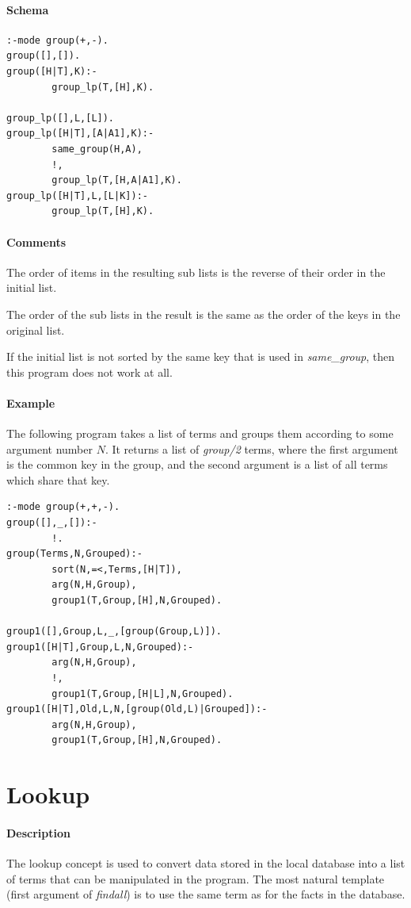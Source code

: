 \documentclass[a4paper,12pt]{report}
\begin{document}
\paragraph{Schema}
\begin{verbatim}
:-mode group(+,-).
group([],[]).
group([H|T],K):-
        group_lp(T,[H],K).

group_lp([],L,[L]).
group_lp([H|T],[A|A1],K):-
        same_group(H,A),
        !,
        group_lp(T,[H,A|A1],K).
group_lp([H|T],L,[L|K]):-
        group_lp(T,[H],K).
\end{verbatim}
\paragraph{Comments}
The order of items in the resulting sub lists is the reverse of their order in the initial list.

The order of the sub lists in the result is the same as the order of the keys in the original list.

If the initial list is not sorted by the same key that is used in {\it same\_group}, then this program does not work at all.
\paragraph{Example}
The following program takes a list of terms and groups them according to some argument number $N$. It returns a list of {\it group/2} terms, where the first argument is the common key in the group, and the second argument is a list of all terms which share that key.
\begin{verbatim}
:-mode group(+,+,-).
group([],_,[]):-
        !.
group(Terms,N,Grouped):-
        sort(N,=<,Terms,[H|T]),
        arg(N,H,Group),
        group1(T,Group,[H],N,Grouped).

group1([],Group,L,_,[group(Group,L)]).
group1([H|T],Group,L,N,Grouped):-
        arg(N,H,Group),
        !,
        group1(T,Group,[H|L],N,Grouped).
group1([H|T],Old,L,N,[group(Old,L)|Grouped]):-
        arg(N,H,Group),
        group1(T,Group,[H],N,Grouped).
\end{verbatim}

\pagebreak
\section{Lookup}
\paragraph{Description}
The lookup concept is used to convert data stored in the local database into a list of terms that can be manipulated in the program. The most natural template (first argument of {\it findall}) is to use the same term as for the facts in the database.
\end{document}
